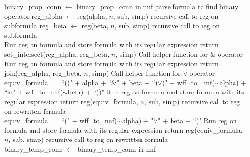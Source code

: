\documentclass[runningheads]{llncs}
\begin{document}
\begin{algorithm}[H]
\begin{algorithmic}
        \State binary\_prop\_conn $\leftarrow$ binary\_prop\_conn in nnf
        \Comment parse formula to find binary operator
        \State reg\_alpha $\leftarrow$ reg(alpha, $n$, sub, simp)
        \Comment recursive call to reg on subformula
        \State reg\_beta $\leftarrow$ reg(beta, $n$, sub, simp)
        \Comment recursive call to reg on subformula\\
                \State Run reg on formula and store formula with its regular expression
            \EndIf
            \State return set\_intersect(reg\_alpha, reg\_beta, $n$, simp)
            \Comment Call helper function for \& operator
        \EndIf\\
                \State Run reg on formula and store formula with its regular expression
            \EndIf
            \State return join(reg\_alpha, reg\_beta, $n$, simp)
            \Comment Call helper function for $\lor$ operator
        \EndIf\\
            \State equiv\_formula $=$ ``((" + alpha + ``\&" + beta + ``)$\lor$(" + wff\_to\_nnf($\scriptstyle{\sim}$alpha) + 
            \State ``\&" + wff\_to\_nnf($\scriptstyle{\sim}$beta) + ``))"
                \State Run reg on formula and store formula with its regular expression
            \EndIf
            \State return reg(equiv\_formula, $n$, sub, simp)
            \Comment recursive call to reg on rewritten formula
        \EndIf\\
            \State equiv\_formula $=$ ``(" + wff\_to\_nnf($\scriptstyle{\sim}$alpha) + "$\lor$" + beta + ``)"
                \State Run reg on formula and store formula with its regular expression
            \EndIf
            \State return reg(equiv\_formula, $n$, sub, simp)
            \Comment recursive call to reg on rewritten formula
        \EndIf
    \EndIf\\
        \State binary\_temp\_conn $\leftarrow$ binary\_temp\_conn in nnf

\end{algorithmic}
\end{algorithm}
\end{document}
